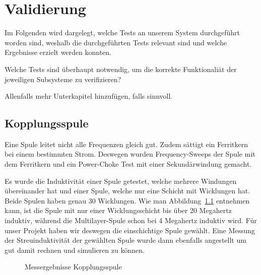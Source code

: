 \chapter{Validierung}
\label{chap:validierung}

Im Folgenden  wird dargelegt,  welche Tests  an unserem  System durchgef\"uhrt
worden  sind, weshalb  die  durchgef\"uhrten Tests  relevant  sind und  welche
Ergebnisse erzielt werden konnten.

\anweisung  Welche   Tests  sind   \"uberhaupt  notwendig,  um   die  korrekte
Funktionali\"at der jeweiligen Subsysteme zu verifizieren?

\anweisung Allenfalls mehr Unterkapitel hinzuf\"ugen, falls sinnvoll.

\section{Kopplungsspule}
\label{sec:val:coupling:coil}

Eine Spule leitet nicht alle Frequenzen gleich gut. Zudem sättigt ein Ferritkern bei einem bestimmten Strom. Deswegen wurden Frequency-Sweeps der Spule mit dem Ferritkern und ein Power-Choke Test mit einer Sekundärwindung gemacht.

Es wurde die Induktivität einer Spule getestet, welche mehrere Windungen übereinander hat und einer Spule, welche nur eine Schicht mit Wicklungen hat. Beide Spulen haben genau 30 Wicklungen. Wie man Abbildung~\ref{fig:meas:coupling:coil:L} entnehmen kann, ist die Spule mit nur einer Wicklungsschicht bis über 20 Megahertz induktiv, während die Multilayer-Spule schon bei 4 Megahertz induktiv wird. Für unser Projekt haben wir deswegen die einschichtige Spule gewählt. Eine Messung der Streuinduktivität der gewählten Spule wurde dann ebenfalls angestellt um gut damit rechnen und simulieren zu können.

\begin{figure}[h!tb]
    \centering
    
    \caption[Messresultate Kopplungsspule]{Messergebnisse Kopplungsspule}
    \label{fig:meas:coupling:coil:L}
\end{figure}


